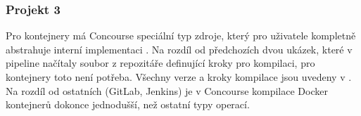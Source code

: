         \subsubsection{Projekt 3}
            Pro kontejnery má Concourse speciální typ zdroje, který pro uživatele kompletně abstrahuje interní implementaci . Na rozdíl od předchozích dvou ukázek, které v pipeline načítaly soubor z repozitáře definující kroky pro kompilaci, pro kontejnery toto není potřeba. Všechny verze a kroky kompilace jsou uvedeny v . Na rozdíl od ostatních \CI (GitLab, Jenkins) je v Concourse kompilace Docker kontejnerů dokonce jednodušší, než ostatní typy operací.
